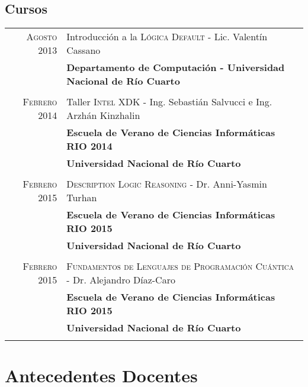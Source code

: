 \documentclass[a4paper,10pt]{article} %
\begin{document}
\subsection{Cursos}

\begin{tabular}{rl}

\\
\textsc{Agosto} 2013 & Introducción a la \textsc{Lógica Default} - Lic. Valentín Cassano \\ 
& \textbf{Departamento de Computación - Universidad Nacional de Río Cuarto} \\ & \\


\textsc{Febrero} 2014 & Taller \textsc{Intel XDK} - Ing. Sebastián Salvucci e Ing. Arzhán Kinzhalin \\
& \textbf{Escuela de Verano de Ciencias Informáticas RIO 2014} \\
& \textbf{Universidad Nacional de Río Cuarto} \\ & \\


\textsc{Febrero} 2015 & \textsc{Description Logic Reasoning} - Dr. Anni-Yasmin Turhan\\
& \textbf{Escuela de Verano de Ciencias Informáticas RIO 2015} \\
& \textbf{Universidad Nacional de Río Cuarto} \\ & \\


\textsc{Febrero} 2015 & \textsc{Fundamentos de Lenguajes de Programación Cuántica} - Dr. Alejandro Díaz-Caro \\
& \textbf{Escuela de Verano de Ciencias Informáticas RIO 2015} \\
& \textbf{Universidad Nacional de Río Cuarto} \\ & \\

\end{tabular}

\section{Antecedentes Docentes}
\end{document}
